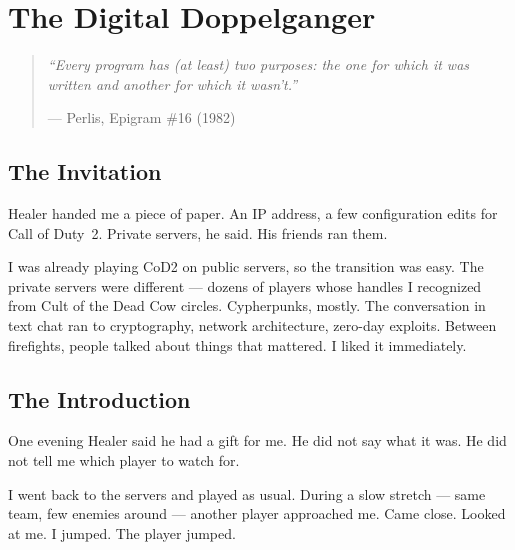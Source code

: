 
\chapter{The Digital Doppelganger}
\label{pos33:digital-doppelganger}

\begin{quote}\small\textit{%
``Every program has (at least) two purposes: the one for which it was written and another for which it wasn't.''%
}\par\raggedleft --- Perlis, Epigram \#16 (1982)\end{quote}

\vspace{0.5cm}


\section*{The Invitation}
\label{pos33:the-invitation}

Healer handed me a piece of paper. An IP address, a few configuration edits for Call of Duty~2. Private servers, he said. His friends ran them.

I was already playing CoD2 on public servers, so the transition was easy. The private servers were different --- dozens of players whose handles I recognized from Cult of the Dead Cow circles. Cypherpunks, mostly. The conversation in text chat ran to cryptography, network architecture, zero-day exploits. Between firefights, people talked about things that mattered. I liked it immediately.

\section*{The Introduction}
\label{pos33:the-introduction}

One evening Healer said he had a gift for me. He did not say what it was. He did not tell me which player to watch for.

I went back to the servers and played as usual. During a slow stretch --- same team, few enemies around --- another player approached me. Came close. Looked at me. I jumped. The player jumped.

